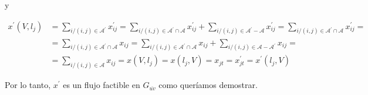\documentclass[10pt]{article}
\begin{document}
y

$$
\begin{aligned}
x^{\prime}\left(V, l_{j}\right) & =\sum_{i /(i, j) \in \mathcal{A}^{\prime}} x_{i j}^{\prime}=\sum_{i /(i, j) \in \mathcal{A}^{\prime} \cap \mathcal{A}} x_{i j}^{\prime}+\sum_{i /(i, j) \in \mathcal{A}^{\prime}-\mathcal{A}} x_{i j}^{\prime}=\sum_{i /(i, j) \in \mathcal{A}^{\prime} \cap \mathcal{A}} x_{i j}^{\prime}= \\
& =\sum_{i /(i, j) \in \mathcal{A}^{\prime} \cap \mathcal{A}} x_{i j}=\sum_{i /(i, j) \in \mathcal{A}^{\prime} \cap \mathcal{A}} x_{i j}+\sum_{i /(i, j) \in \mathcal{A}-\mathcal{A}^{\prime}} x_{i j}= \\
& =\sum_{i /(i, j) \in \mathcal{A}} x_{i j}=x\left(V, l_{j}\right)=x\left(l_{j}, V\right)=x_{j t}=x_{j t}^{\prime}=x^{\prime}\left(l_{j}, V\right)
\end{aligned}
$$

Por lo tanto, $x^{\prime}$ es un flujo factible en $G_{\overline{u v}}$ como queríamos demostrar.
\end{document}
